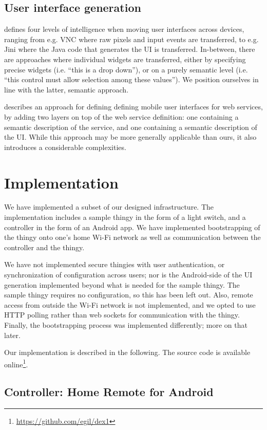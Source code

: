 \documentclass{ubicomp2012}
\begin{document}
\subsection{User interface generation}

\cite{kindbergSystem} defines four levels of intelligence when moving user interfaces across devices, ranging from e.g. VNC\cite{vnc} where raw pixels and input events are transferred, to e.g. Jini\cite{jini} where the Java code that generates the UI is transferred. In-between, there are approaches where individual widgets are transferred, either by specifying precise widgets (i.e. ``this is a drop down''), or on a purely semantic level (i.e. ``this control must allow selection among these values''). We position ourselves in line with the latter, semantic approach.

\cite{mobileServiceUsage} describes an approach for defining defining mobile user interfaces for web services, by adding two layers on top of the web service definition: one containing a semantic description of the service, and one containing a semantic description of the UI. While this approach may be more generally applicable than ours, it also introduces a considerable complexities.
\section{Implementation}

We have implemented a subset of our designed infrastructure. The implementation includes a sample thingy in the form of a light switch, and a controller in the form of an Android app. We have implemented bootstrapping of the thingy onto one's home Wi-Fi network as well as communication between the controller and the thingy.

We have not implemented secure thingies with user authentication, or synchronization of configuration across users; nor is the Android-side of the UI generation implemented beyond what is needed for the sample thingy. The sample thingy requires no configuration, so this has been left out. Also, remote access from outside the Wi-Fi network is not implemented, and we opted to use HTTP polling rather than web sockets for communication with the thingy. Finally, the bootstrapping process was implemented differently; more on that later.

Our implementation is described in the following. The source code is available online\footnote{\url{https://github.com/egil/dex1}}.

\subsection{Controller: Home Remote for Android}
\end{document}
